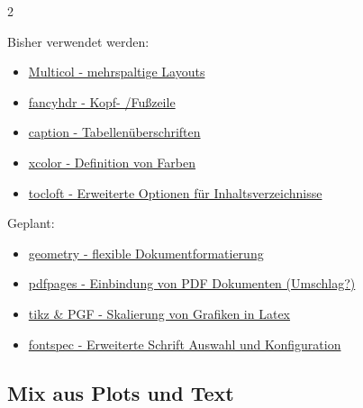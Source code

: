 \documentclass[
  a4paper,
  twoside]{article}
\providecommand{\tightlist}{%
  \setlength{\itemsep}{0pt}\setlength{\parskip}{0pt}}
\begin{document}
\begin {multicols}{2}

Bisher verwendet werden:

\begin{itemize}
\tightlist
\item
  \href{https://www.ctan.org/pkg/multicol}{Multicol - mehrspaltige Layouts}
\item
  \href{https://ctan.org/pkg/fancyhdr?lang=de}{fancyhdr - Kopf- /Fußzeile}
\item
  \href{https://ctan.org/pkg/caption?lang=de}{caption - Tabellenüberschriften}
\item
  \href{https://ctan.org/pkg/xcolor?lang=de}{xcolor - Definition von Farben}
\item
  \href{https://www.ctan.org/pkg/tocloft}{tocloft - Erweiterte Optionen für Inhaltsverzeichnisse}
  \newline
  \newline
\end{itemize}

\columnbreak

Geplant:

\begin{itemize}
\tightlist
\item
  \href{https://ctan.org/pkg/geometry?lang=en}{geometry - flexible Dokumentformatierung}
\item
  \href{https://ctan.org/pkg/pdfpages}{pdfpages - Einbindung von PDF Dokumenten (Umschlag?)}
\item
  \href{https://ctan.org/pkg/pgf?lang=de}{tikz \& PGF - Skalierung von Grafiken in Latex}
\item
  \href{https://www.ctan.org/pkg/fontspec}{fontspec - Erweiterte Schrift Auswahl und Konfiguration}
\end{itemize}

\end {multicols}

\newpage

\hypertarget{mix-aus-plots-und-text}{%
\subsection{Mix aus Plots und Text}\label{mix-aus-plots-und-text}}
\end{document}
